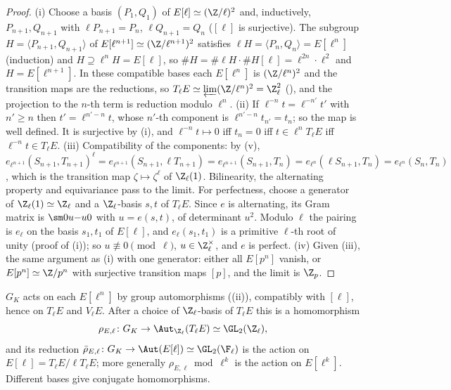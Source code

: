 \begin{proof}
(i) Choose a basis $(P_1,Q_1)$ of $E[\ell]\simeq(\Z/\ell)^2$ and, inductively, $P_{n+1},Q_{n+1}$ with $\ell P_{n+1}=P_n$, $\ell Q_{n+1}=Q_n$ ($[\ell]$ is surjective). The subgroup
$H=\langle P_{n+1},Q_{n+1}\rangle$ of $E[\ell^{n+1}]\simeq(\Z/\ell^{n+1})^2$ satisfies $\ell H=\langle P_n,Q_n\rangle=E[\ell^n]$ (induction) and $H\supseteq\ell^nH=E[\ell]$, so
$\#H=\#\ell H\cdot\#H[\ell]=\ell^{2n}\cdot\ell^2$ and $H=E[\ell^{n+1}]$. In these compatible bases each $E[\ell^n]$ is $(\Z/\ell^n)^2$ and the transition maps are the reductions, so
$T_\ell E\simeq\varprojlim(\Z/\ell^n)^2=\Z_\ell^2$ (), and the projection to the $n$-th term is reduction modulo $\ell^n$. (ii) If $\ell^{-n}t=\ell^{-n'}t'$ with $n'\ge n$ then
$t'=\ell^{n'-n}t$, whose $n'$-th component is $\ell^{n'-n}t_{n'}=t_n$; so the map is well defined. It is surjective by (i), and $\ell^{-n}t\mapsto0$ iff $t_n=0$ iff
$t\in\ell^nT_\ell E$ iff $\ell^{-n}t\in T_\ell E$. (iii) Compatibility of the components: by (v),
$e_{\ell^{n+1}}(S_{n+1},T_{n+1})^\ell=e_{\ell^{n+1}}(S_{n+1},\ell T_{n+1})=e_{\ell^{n+1}}(S_{n+1},T_n)=e_{\ell^n}(\ell S_{n+1},T_n)=e_{\ell^n}(S_n,T_n)$, which is the transition map
$\zeta\mapsto\zeta^\ell$ of $\Z_\ell(1)$. Bilinearity, the alternating property and equivariance pass to the limit. For perfectness, choose a generator of
$\Z_\ell(1)\simeq\Z_\ell$ and a $\Z_\ell$-basis $s,t$ of $T_\ell E$. Since $e$ is alternating, its Gram matrix is $\sm0u{-u}0$ with $u=e(s,t)$, of determinant $u^2$. Modulo $\ell$
the pairing is $e_\ell$ on the basis $s_1,t_1$ of $E[\ell]$, and $e_\ell(s_1,t_1)$ is a primitive $\ell$-th root of unity (proof of (i)); so $u\not\equiv0\pmod\ell$, $u\in\Z_\ell^\times$,
and $e$ is perfect. (iv) Given (iii), the same argument as
(i) with one generator: either all $E[p^n]$ vanish, or $E[p^n]\simeq\Z/p^n$ with surjective transition maps $[p]$, and the limit is $\Z_p$.
\end{proof}

\begin{definition}\label{def:ellcurves:rho}
$G_K$ acts on each $E[\ell^n]$ by group automorphisms ((ii)), compatibly with $[\ell]$, hence on $T_\ell E$ and $V_\ell E$. After a choice of
$\Z_\ell$-basis of $T_\ell E$ this is a homomorphism
\[
\rho_{E,\ell}\colon G_K\to\Aut_{\Z_\ell}(T_\ell E)\simeq\GL_2(\Z_\ell),
\]
and its reduction $\bar\rho_{E,\ell}\colon G_K\to\Aut(E[\ell])\simeq\GL_2(\F_\ell)$ is the action on $E[\ell]=T_\ell E/\ell T_\ell E$; more generally $\rho_{E,\ell}\bmod\ell^k$ is the action on
$E[\ell^k]$. Different bases give conjugate homomorphisms.
\end{definition}

